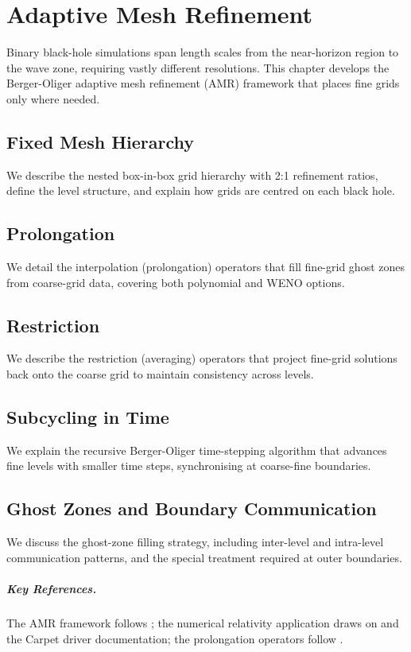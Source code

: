 \chapter{Adaptive Mesh Refinement}
\label{ch:amr}

Binary black-hole simulations span length scales from the near-horizon region
to the wave zone, requiring vastly different resolutions. This chapter develops
the Berger-Oliger adaptive mesh refinement (AMR) framework that places
fine grids only where needed.

\section{Fixed Mesh Hierarchy}
\label{sec:amr-hierarchy}

We describe the nested box-in-box grid hierarchy with 2:1 refinement ratios,
define the level structure, and explain how grids are centred on each black
hole.

\section{Prolongation}
\label{sec:amr-prolongation}

We detail the interpolation (prolongation) operators that fill fine-grid ghost
zones from coarse-grid data, covering both polynomial and WENO options.

\section{Restriction}
\label{sec:amr-restriction}

We describe the restriction (averaging) operators that project fine-grid
solutions back onto the coarse grid to maintain consistency across levels.

\section{Subcycling in Time}
\label{sec:amr-subcycling}

We explain the recursive Berger-Oliger time-stepping algorithm that advances
fine levels with smaller time steps, synchronising at coarse-fine boundaries.

\section{Ghost Zones and Boundary Communication}
\label{sec:amr-ghost-zones}

We discuss the ghost-zone filling strategy, including inter-level and
intra-level communication patterns, and the special treatment required at
outer boundaries.

\paragraph{Key References.}
The AMR framework follows \cite{Berger1984,Berger1989}; the numerical relativity
application draws on \cite{Schnetter2004} and the Carpet driver
documentation; the prolongation operators follow \cite{Baumgarte2010}.
